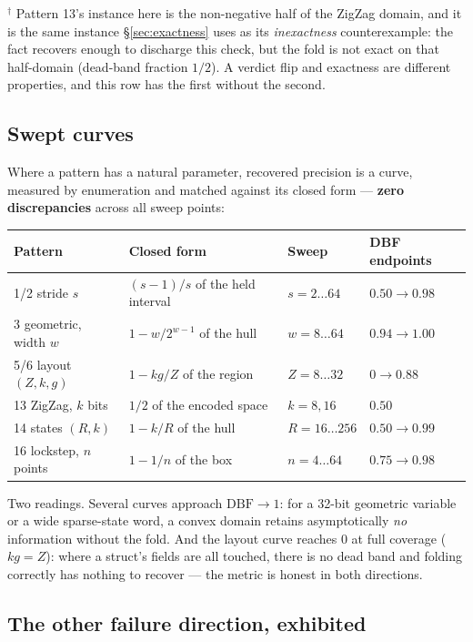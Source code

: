 \documentclass[11pt,a4paper]{article}
\begin{document}
\noindent
$^\dagger$ Pattern 13's instance here is the non-negative half of the ZigZag domain, and
it is the same instance \S\ref{sec:exactness} uses as its \emph{inexactness}
counterexample: the fact recovers enough to discharge this check, but the fold is not
exact on that half-domain (dead-band fraction $1/2$). A verdict flip and exactness are
different properties, and this row has the first without the second.

\subsection{Swept curves}

Where a pattern has a natural parameter, recovered precision is a curve, measured by
enumeration and matched against its closed form --- \textbf{zero discrepancies} across
all sweep points:

\begin{center}
\begin{tabular}{llll}
\toprule
Pattern & Closed form & Sweep & DBF endpoints \\
\midrule
1/2 stride $s$ & $(s{-}1)/s$ of the held interval & $s = 2 \dots 64$ & $0.50 \to 0.98$ \\
3 geometric, width $w$ & $1 - w/2^{w-1}$ of the hull & $w = 8 \dots 64$ & $0.94 \to 1.00$ \\
5/6 layout $(Z,k,g)$ & $1 - kg/Z$ of the region & $Z = 8 \dots 32$ & $0 \to 0.88$ \\
13 ZigZag, $k$ bits & $1/2$ of the encoded space & $k = 8, 16$ & $0.50$ \\
14 states $(R,k)$ & $1 - k/R$ of the hull & $R = 16 \dots 256$ & $0.50 \to 0.99$ \\
16 lockstep, $n$ points & $1 - 1/n$ of the box & $n = 4 \dots 64$ & $0.75 \to 0.98$ \\
\bottomrule
\end{tabular}
\end{center}

\noindent
Two readings. Several curves approach $\mathrm{DBF} \to 1$: for a 32-bit geometric
variable or a wide sparse-state word, a convex domain retains asymptotically \emph{no}
information without the fold. And the layout curve reaches $0$ at full coverage
($k g = Z$): where a struct's fields are all touched, there is no dead band and folding
correctly has nothing to recover --- the metric is honest in both directions.

\subsection{The other failure direction, exhibited}
\end{document}
